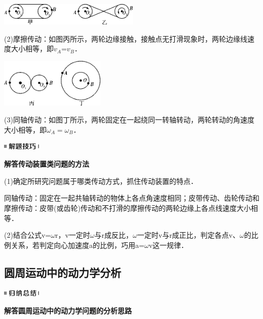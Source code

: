 \begin{center}\includegraphics[width=2.65in,height=0.41667in]{media/image181.png}\end{center}

(2)摩擦传动：如图丙所示，两轮边缘接触，接触点无打滑现象时，两轮边缘线速度大小相等，即$v_A$=$v_B$．

\begin{center}\includegraphics[width=1.98333in,height=0.91667in]{media/image182.png}\end{center}

(3)同轴传动：如图丁所示，两轮固定在一起绕同一转轴转动，两轮转动的角速度大小相等，即$\omega_A=\omega_B$．

\begin{center}\includegraphics[width=0.71667in,height=0.13333in]{media/image37.png}

\textbf{解答传动装置类问题的方法}
\end{center}


(1)确定所研究问题属于哪类传动方式，抓住传动装置的特点．

同轴传动：固定在一起共轴转动的物体上各点角速度相同；皮带传动、齿轮传动和摩擦传动：皮带(或齿轮)传动和不打滑的摩擦传动的两轮边缘上各点线速度大小相等．

(2)结合公式v=$\omega$r，v一定时$\omega$与r成反比，$\omega$一定时v与r成正比，判定各点v、$\omega$的比例关系，若判定向心加速度a的比例，巧用a=$\omega$v这一规律．



\newpage
\subsection{圆周运动中的动力学分析}

\begin{center}\includegraphics[width=0.71667in,height=0.13333in]{media/image13.png}

\textbf{解答圆周运动中的动力学问题的分析思路}
\end{center}


